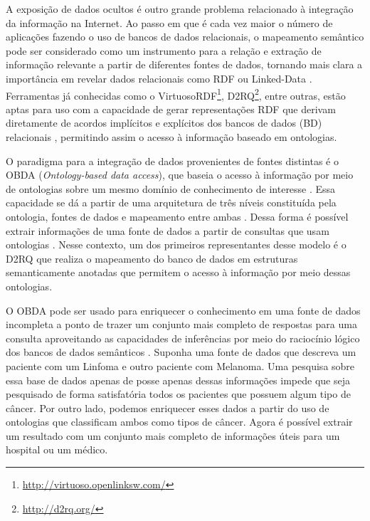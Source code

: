 A exposição de dados ocultos é outro grande problema relacionado à integração da informação na Internet. Ao passo em que é cada vez maior o número de aplicações fazendo o uso de bancos de dados relacionais, o mapeamento semântico pode ser considerado como um instrumento para a relação e extração de informação relevante a partir de diferentes fontes de dados, tornando mais clara a importância em revelar dados relacionais como RDF ou Linked-Data \citep{Hellmann2009}. Ferramentas já conhecidas como o VirtuosoRDF\footnote{\url{http://virtuoso.openlinksw.com/}}, D2RQ\footnote{\url{http://d2rq.org/}}, entre outras, estão aptas para uso com a capacidade de gerar representações RDF que derivam diretamente de acordos implícitos e explícitos dos bancos de dados (BD) relacionais \citep{Hellmann2009}, permitindo assim o acesso à informação baseado em ontologias.

O paradigma para a integração de dados provenientes de fontes distintas é o OBDA (\emph{Ontology-based data access}), que baseia o acesso à informação por meio de ontologias sobre um mesmo domínio de conhecimento de interesse \citep{Civili2013, Lembo2014, Bienvenu2013}. Essa capacidade se dá a partir de uma arquitetura de três níveis constituída pela ontologia,  fontes de dados e  mapeamento entre ambas \citep{Lembo2014, Civili2013}. Dessa forma é possível extrair informações de uma fonte de dados a partir de consultas que usam ontologias \citep{Bienvenu2013}. Nesse contexto, um dos primeiros representantes desse modelo é o D2RQ \citep{Calvanese2016} que realiza o mapeamento do banco de dados em estruturas semanticamente anotadas que permitem o acesso à informação por meio dessas ontologias.

O OBDA pode ser usado para enriquecer o conhecimento em uma fonte de dados incompleta a ponto de trazer um conjunto mais completo de respostas para uma consulta aproveitando as capacidades de inferências por meio do raciocínio lógico dos bancos de dados semânticos \citep{Bienvenu2013, Calvanese2016}. Suponha uma fonte de dados que descreva um paciente com um Linfoma e outro paciente com Melanoma. Uma pesquisa sobre essa base de dados apenas de posse apenas dessas informações impede que seja pesquisado de forma satisfatória todos os pacientes que possuem algum tipo de câncer. Por outro lado, podemos enriquecer esses dados a partir do uso de ontologias que classificam ambos como tipos de câncer. Agora é possível extrair um resultado com um conjunto mais completo de informações úteis para um hospital ou um médico.

